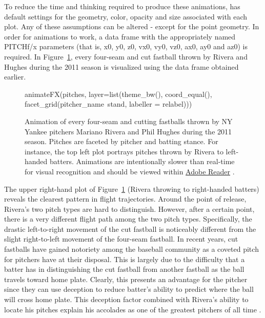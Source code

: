 \documentclass[a4paper]{report}\usepackage[]{graphicx}\usepackage[]{color}
\begin{document}
\begin{article}
To reduce the time and thinking required to produce these animations,
 has default settings for the geometry, color, opacity
and size associated with each plot. Any of these assumptions can be
altered - except for the point geometry. In order for animations to
work, a data frame with the appropriately named PITCHf/x parameters
(that is, x0, y0, z0, vx0, vy0, vz0, ax0, ay0 and az0) is required.
In Figure~\ref{fig:animate1}, every four-seam and cut fastball thrown
by Rivera and Hughes during the 2011 season is visualized using the
 data frame obtained earlier.




\begin{figure}[h]
\begin{Schunk}
\begin{Sinput}
animateFX(pitches, layer=list(theme_bw(), coord_equal(),
  facet_grid(pitcher_name~stand, labeller = relabel)))
\end{Sinput}

\end{Schunk}


\caption{\label{fig:animate1}Animation of every four-seam and cutting fastballs
thrown by NY Yankee pitchers Mariano Rivera and Phil Hughes during
the 2011 season. Pitches are faceted by pitcher and batting stance.
For instance, the top left plot portrays pitches thrown by Rivera
to left-handed batters. Animations are intentionally slower than real-time
for visual recognition and should be viewed within \protect\href{http://get.adobe.com/reader/}{Adobe Reader}
\citep{knitr}.}
\end{figure}


The upper right-hand plot of Figure~\ref{fig:animate1} (Rivera throwing
to right-handed batters) reveals the clearest pattern in flight trajectories.
Around the point of release, Rivera's two pitch types are hard to
distinguish. However, after a certain point, there is a very different
flight path among the two pitch types. Specifically, the drastic left-to-right
movement of the cut fastball is noticeably different from the slight
right-to-left movement of the four-seam fastball. In recent years,
cut fastballs have gained notoriety among the baseball community as
a coveted pitch for pitchers have at their disposal. This is largely
due to the difficulty that a batter has in distinguishing the cut
fastball from another fastball as the ball travels toward home plate.
Clearly, this presents an advantage for the pitcher since they can
use deception to reduce batter's ability to predict where the ball
will cross home plate. This deception factor combined with Rivera's
ability to locate his pitches explain his accolades as one of the
greatest pitchers of all time \citep{NYT}.


\end{article}
\end{document}
